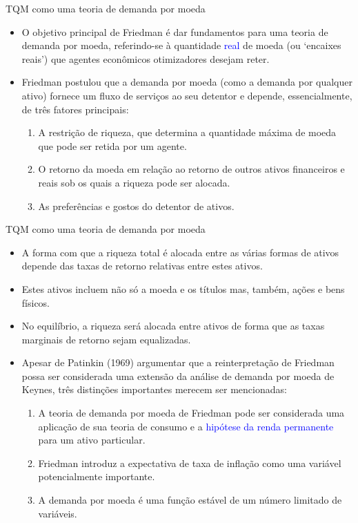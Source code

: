 \documentclass[10pt]{beamer}
\begin{document}
\begin{frame}{TQM como uma teoria de demanda por moeda}
    \begin{itemize}
        \item O objetivo principal de Friedman é dar fundamentos para uma teoria de demanda por moeda, referindo-se à quantidade \textcolor{blue}{real} de moeda (ou `encaixes reais') que agentes econômicos otimizadores desejam reter.
        \bigskip
        \item Friedman postulou que a demanda por moeda (como a demanda por qualquer ativo) fornece um fluxo de serviços ao seu detentor e depende, essencialmente, de três fatores principais:
        \bigskip
        \begin{enumerate}
            \item A restrição de riqueza, que determina a quantidade máxima de moeda que pode ser retida por um agente.
            \bigskip
            \item O retorno da moeda em relação ao retorno de outros ativos financeiros e reais sob os quais a riqueza pode ser alocada.
            \bigskip
            \item As preferências e gostos do detentor de ativos.
        \end{enumerate}
    \end{itemize}
\end{frame}

\begin{frame}{TQM como uma teoria de demanda por moeda}
    \begin{itemize}
        \item A forma com que a riqueza total é alocada entre as várias formas de ativos depende das taxas de retorno relativas entre estes ativos.
        \bigskip
        \item Estes ativos incluem não só a moeda e os títulos mas, também, ações e bens físicos.
        \bigskip
        \item No equilíbrio, a riqueza será alocada entre ativos de forma que as taxas marginais de retorno sejam equalizadas.
        \bigskip
        \item Apesar de Patinkin (1969) argumentar que a reinterpretação de Friedman possa ser considerada uma extensão da análise de demanda por moeda de Keynes, três distinções importantes merecem ser mencionadas:
        \bigskip
        \begin{enumerate}
            \item A teoria de demanda por moeda de Friedman pode ser considerada uma aplicação de sua teoria de consumo e a \textcolor{blue}{hipótese da renda permanente} para um ativo particular.
            \bigskip
            \item Friedman introduz a expectativa de taxa de inflação como uma variável potencialmente importante.
            \bigskip
            \item A demanda por moeda é uma função estável de um número limitado de variáveis.
        \end{enumerate}
    \end{itemize}
\end{frame}
\end{document}
